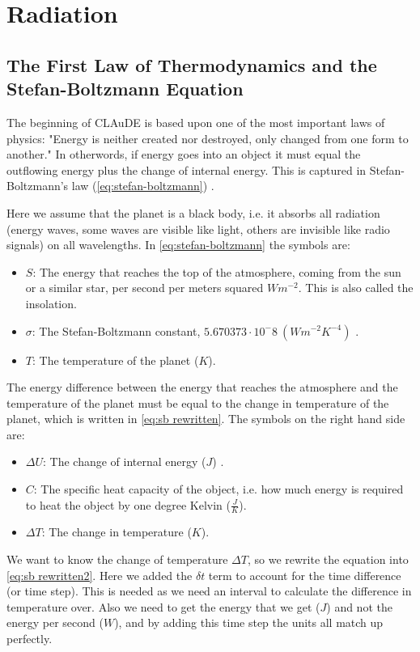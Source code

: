 \section{Radiation}
\subsection{The First Law of Thermodynamics and the Stefan-Boltzmann Equation}
The beginning of CLAuDE is based upon one of the most important laws of physics: "Energy is neither created nor destroyed, only changed from one form to another." In otherwords, if energy goes 
into an object it must equal the outflowing energy plus the change of internal energy. This is captured in Stefan-Boltzmann's law (\autoref{eq:stefan-boltzmann}) \cite{stefan-boltzmann}. 

Here we assume that the planet is a black body, i.e. it absorbs all radiation (energy waves, some waves are visible like light, others are invisible like radio signals) on all wavelengths. 
In \autoref{eq:stefan-boltzmann} the symbols are:

\begin{itemize}
    \item $S$: The energy that reaches the top of the atmosphere, coming from the sun or a similar star, per second per meters squared $Wm^{-2}$. This is also called the insolation.
    \item $\sigma$: The Stefan-Boltzmann constant, $5.670373 \cdot 10^-8 \ (Wm^{-2}K^{-4})$ \cite{stefan-boltzmann}.
    \item $T$: The temperature of the planet ($K$).
\end{itemize}

The energy difference between the energy that reaches the atmosphere and the temperature of the planet must be equal to the change in temperature of the planet, which is written in 
\autoref{eq:sb rewritten}. The symbols on the right hand side are:

\begin{itemize}
    \item $\Delta U$: The change of internal energy ($J$) \cite{thermo1}.
    \item $C$: The specific heat capacity of the object, i.e. how much energy is required to heat the object by one degree Kelvin ($\frac{J}{K}$).
    \item $\Delta T$: The change in temperature ($K$).
\end{itemize}

We want to know the change of temperature $\Delta T$, so we rewrite the equation into \autoref{eq:sb rewritten2}. Here we added the $\delta t$ term to account for the time difference (or time 
step). This is needed as we need an interval to calculate the difference in temperature over. Also we need to get the energy that we get ($J$) and not the energy per second ($W$), and by adding 
this time step the units all match up perfectly.


